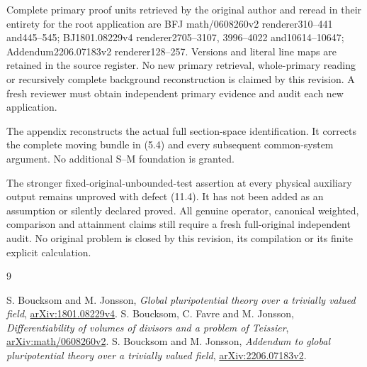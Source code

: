 \documentclass[10pt]{article}
\begin{document}
Complete primary proof units retrieved by the original author and reread
in their entirety for the root application are BFJ math/0608260v2
renderer310--441 and445--545; BJ1801.08229v4 renderer2705--3107,
3996--4022 and10614--10647; Addendum2206.07183v2 renderer128--257.
Versions and literal line maps are retained in the source register.
No new primary retrieval, whole-primary reading or recursively complete
background reconstruction is claimed by this revision. A fresh reviewer
must obtain independent primary evidence and audit each new application.

The appendix reconstructs the actual full section-space identification.
It corrects the complete moving bundle in (5.4) and every subsequent
common-system argument. No additional S--M foundation is granted.

The stronger fixed-original-unbounded-test assertion at every physical
auxiliary output remains unproved with defect (11.4). It has not been
added as an assumption or silently declared proved. All genuine operator,
canonical weighted, comparison and attainment claims still require a
fresh full-original independent audit. No original problem is closed by
this revision, its compilation or its finite explicit calculation.

\begin{thebibliography}{9}
\raggedright
{} S. Boucksom and M. Jonsson, \emph{Global pluripotential theory
over a trivially valued field}, \href{https://arxiv.org/pdf/1801.08229v4}{arXiv:1801.08229v4}.
 S. Boucksom, C. Favre and M. Jonsson, \emph{Differentiability
of volumes of divisors and a problem of Teissier},
\href{https://arxiv.org/html/math/0608260v2}{arXiv:math/0608260v2}.
 S. Boucksom and M. Jonsson, \emph{Addendum to global
pluripotential theory over a trivially valued field},
\href{https://arxiv.org/pdf/2206.07183v2}{arXiv:2206.07183v2}.
\end{thebibliography}
\end{document}
